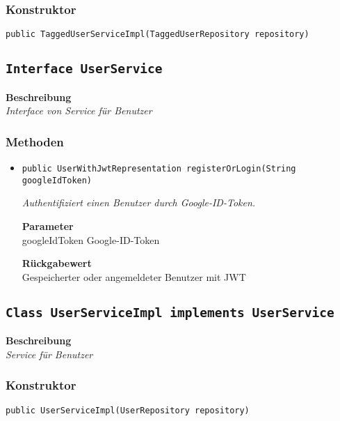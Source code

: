     \subsubsection{Konstruktor}
    \texttt{public TaggedUserServiceImpl(TaggedUserRepository repository)}
    \subsection{\texttt{Interface UserService}}
    \textbf{Beschreibung} \\
    \textit{Interface von Service für Benutzer}
    \subsubsection{Methoden}
    \begin{itemize}
    	\item{\texttt{public UserWithJwtRepresentation registerOrLogin(String googleIdToken)}}
    	
    	\textit{Authentifiziert einen Benutzer durch Google-ID-Token.}
    	
    	\textbf{Parameter} \\
    	googleIdToken Google-ID-Token
    	
    	\textbf{Rückgabewert} \\
    	Gespeicherter oder angemeldeter Benutzer mit JWT
    \end{itemize}
    \subsection{\texttt{Class UserServiceImpl implements UserService}}
    \textbf{Beschreibung} \\
    \textit{Service für Benutzer}
    \subsubsection{Konstruktor}
    \texttt{public UserServiceImpl(UserRepository repository)}

%